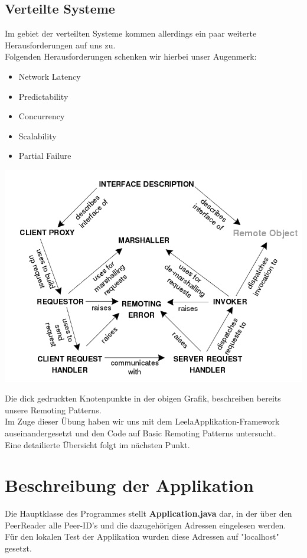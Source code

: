 \documentclass[a4paper]{article}
\begin{document}
\subsection{Verteilte Systeme}
Im gebiet der verteilten Systeme kommen allerdings ein paar weiterte Herausforderungen auf uns zu.\\
Folgenden Herausforderungen schenken wir hierbei unser Augenmerk:
\begin{itemize}
	\item Network Latency
	\item Predictability
	\item Concurrency
	\item Scalability
	\item Partial Failure
\end{itemize}
\begin{center}
	\includegraphics[scale=0.4]{img/remoting_patterns.png}
\end{center}
Die dick gedruckten Knotenpunkte in der obigen Grafik, beschreiben bereits unsere Remoting Patterns.\\
Im Zuge dieser Übung haben wir uns mit dem LeelaApplikation-Framework auseinandergesetzt und den Code auf Basic Remoting Patterns untersucht.\\
Eine detailierte Übersicht folgt im nächsten Punkt.
\cite{RP-WU-Wien}

\newpage
\section{Beschreibung der Applikation}
Die Hauptklasse des Programmes stellt \textbf{Application.java} dar, in der über den PeerReader alle Peer-ID's und die dazugehörigen Adressen eingelesen werden.\\
Für den lokalen Test der Applikation wurden diese Adressen auf "localhost" gesetzt.\\
\\
\end{document}
